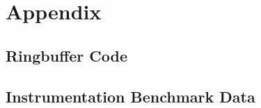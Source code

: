 %
\chapter{Appendix}
\label{sec:appendix}

\section{Ringbuffer Code}
\label{sec:appendix:ringbuffer}



\section{Instrumentation Benchmark Data}
\label{sec:appendix:instrumentation_benchmark_data}


